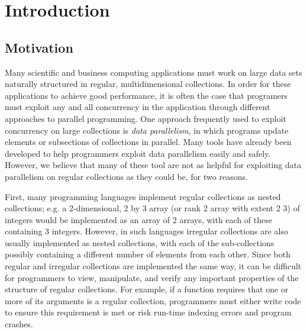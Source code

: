 \chapter{Introduction}

\section{Motivation}
Many scientific and business computing applications must work on large data sets naturally structured in regular, multidimensional collections.
In order for these applications to achieve good performance, it is often the case that programers must exploit any and all concurrency in the application through different approaches to parallel programming.
One approach frequently used to exploit concurrency on large collections is \textit{data parallelism}, in which programs update elements or subsections of collections in parallel.
Many tools have already been developed to help programmers exploit data parallelism easily and safely. %
However, we believe that many of these tool are not as helpful for exploiting data parallelism on regular collections as they could be, for two reasons.

First, many programming languages implement regular collections as nested collections;
e.g. a 2-dimensional, 2 by 3 array (or rank 2 array with extent 2 3) of integers would be implemented as an array of 2 arrays, with each of these containing 3 integers. %
However, in such languages irregular collections are also usually implemented as nested collections, with each of the sub-collections possibly containing a different number of elements from each other.
Since both regular and irregular collections are implemented the same way,
it can be difficult for programmers to view, manipulate, and verify any important properties of the structure of regular collections.
For example, if a function requires that one or more of its arguments is a regular collection, programmers must either write code to ensure this requirement is met or risk run-time indexing errors and program crashes.

